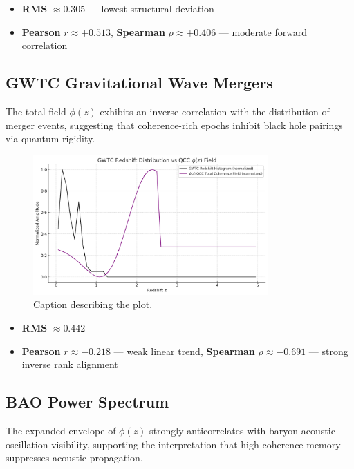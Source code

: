 \documentclass[12pt]{article}
\begin{document}
	\begin{itemize}
		\item \textbf{RMS} $\approx 0.305$ — lowest structural deviation
		\item \textbf{Pearson} \( r \approx +0.513 \), \textbf{Spearman} \( \rho \approx +0.406 \) — moderate forward correlation
	\end{itemize}
	
	\newpage
	
	\subsection*{GWTC Gravitational Wave Mergers}
	The total field \( \phi(z) \) exhibits an inverse correlation with the distribution of merger events, suggesting that coherence-rich epochs inhibit black hole pairings via quantum rigidity.
	
	\begin{figure}[htbp]
		\centering
		\includegraphics[width=0.8\textwidth]{GWTCvsQCCtotal.png} 
		\caption{Caption describing the plot.}
		\label{fig:GWTCvsQCCtotal}
	\end{figure}
	
	\begin{itemize}
		\item \textbf{RMS} $\approx 0.442$
		\item \textbf{Pearson} \( r \approx -0.218 \) — weak linear trend, \textbf{Spearman} \( \rho \approx -0.691 \) — strong inverse rank alignment
	\end{itemize}
	
	\newpage
	
	\subsection*{BAO Power Spectrum}
	The expanded envelope of \( \phi(z) \) strongly anticorrelates with baryon acoustic oscillation visibility, supporting the interpretation that high coherence memory suppresses acoustic propagation.
	
\end{document}
